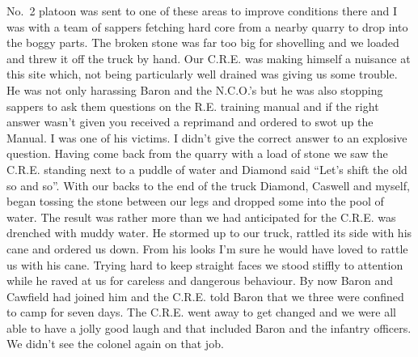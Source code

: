 No.~2 platoon was sent to one of these areas to improve conditions
there and I was with a team of sappers fetching hard core from a
nearby quarry to drop into the boggy parts. The broken stone was far
too big for shovelling and we loaded and threw it off the truck by
hand. Our C.R.E. was making himself a nuisance at this site which, not
being particularly well drained was giving us some trouble. He was not
only harassing \lieutenant Baron and the N.C.O.'s but he was also
stopping sappers to ask them questions on the R.E. training manual and
if the right answer wasn't given you received a reprimand and ordered
to swot up the Manual. I was one of his victims. I didn't give the
correct answer to an explosive question. Having come back from the
quarry with a load of stone we saw the C.R.E. standing next to a
puddle of water and Diamond said ``Let's shift the old so and
so''. With our backs to the end of the truck Diamond, Caswell and
myself, began tossing the stone between our legs and dropped some into
the pool of water. The result was rather more than we had anticipated
for the C.R.E. was drenched with muddy water. He stormed up to our
truck, rattled its side with his cane and ordered us down. From his
looks I'm sure he would have loved to rattle us with his cane. Trying
hard to keep straight faces we stood stiffly to attention while he
raved at us for careless and dangerous behaviour. By now \lieutenant
Baron and \sergeant Cawfield had joined him and the C.R.E. told
\lieutenant Baron that we three were confined to camp for seven
days. The C.R.E. went away to get changed and we were all able to have
a jolly good laugh and that included \lieutenant Baron and the
infantry officers. We didn't see the colonel again on that job.

